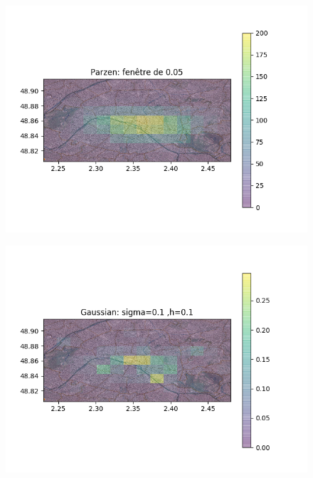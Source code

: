 \documentclass[a4paper]{article}
\begin{document}
\begin{figure}[ht!]
\begin{center}
\begin{minipage}{0.45\textwidth}
\includegraphics[scale=0.5]{Parzen005.png}
\label{f1_trajectoire}
\end{minipage}\hfill
\begin{minipage}{0.45\textwidth}
\includegraphics[scale=0.5]{Gaussian01.png}
\label{f2_trajectoire}
\end{minipage}
\end{center}
\end{figure}
\end{document}
